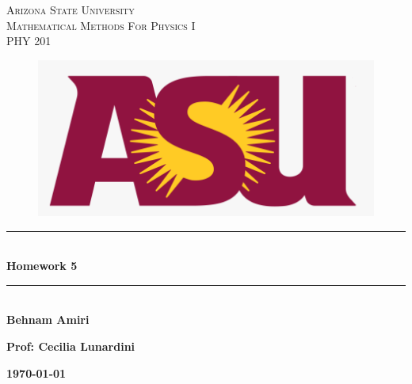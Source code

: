 \documentclass[fleqn]{article}
\begin{document}
\begin{titlepage}

\newcommand{\HRule}{\rule{\linewidth}{0.5mm}} %

\center %
 


\textsc{\LARGE Arizona State University}\\[1.5cm] %

\textsc{\Large Mathematical Methods For Physics I }\\[0.5cm] %
\textsc{\large PHY 201}\\[0.5cm] %



\begin{figure}
  \includegraphics[width=\linewidth]{asu.png}
\end{figure}



\HRule \\[0.4cm]
{ \huge \bfseries Homework 5}\\[0.4cm] 
\HRule \\[1.5cm]
 
\textbf{Behnam Amiri}

\bigbreak

\textbf{Prof: Cecilia Lunardini}

\bigbreak


\textbf{{\large \today}\\[2cm]}

\vfill %

\end{titlepage}
\end{document}
